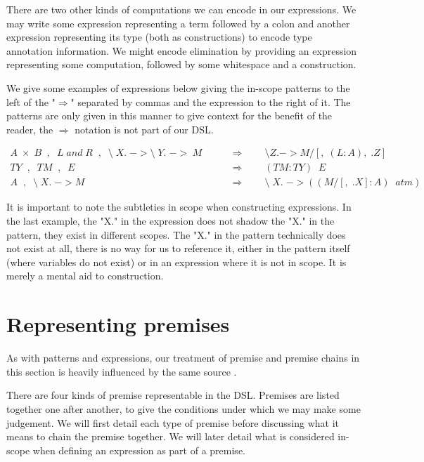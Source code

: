 There are two other kinds of computations we can encode in our
expressions. We may write some expression representing a term followed
by a colon and another expression representing its type (both as constructions)
to encode type annotation information. We might encode elimination by
providing an expression representing some computation, followed by
some whitespace and a construction.

We give some examples of expressions below giving the in-scope patterns
to the left of the "$\Rightarrow$" separated by commas and the
expression to the right of it. The patterns are only given in this
manner to give context for the benefit of the reader, the
$\Rightarrow$ notation is not part of our DSL.

\begin{align*}
  A \; \times \; B \;\; , \;\; L \; and \; R  \;\; , \;\; \mbox{\textbackslash} \;
  X. \; -> \mbox{\textbackslash} \; Y. \; -> \; M \qquad &\Rightarrow
  \qquad \mbox{\textbackslash} Z. -> M/[,\; (L:A),\; .Z]\\
  TY \;\; , \;\; TM \;\; , \;\; E \qquad &\Rightarrow \qquad
  (TM:TY)\;\; E\\
  A \;\; , \;\; \mbox{\textbackslash} \; X. \; -> M \;\; \qquad
  &\Rightarrow \qquad \mbox{\textbackslash} \; X. \; -> ((M/[,\; .X] : A)\;\; atm)
\end{align*}

It is important to note the subtleties in scope when constructing
expressions. In the last example, the "X." in the expression does not
shadow the "X." in the pattern, they exist in different scopes. The
"X." in the pattern technically does not exist at all, there
is no way for us to reference it, either in the pattern itself (where
variables do not exist) or in an expression where it is not in
scope. It is merely a mental aid to construction.

\section{Representing premises}

As with patterns and expressions, our treatment of premise and premise
chains in this section is heavily influenced by the same source
\cite{TypesWhoSayNi}.

There are four kinds of premise representable in the DSL. Premises are
listed together one after another, to give the
conditions under which we may make some judgement. We will first
detail each type of premise before discussing what it means to chain
the premise together. We will later detail what is considered
in-scope when defining an expression as part of a premise.

